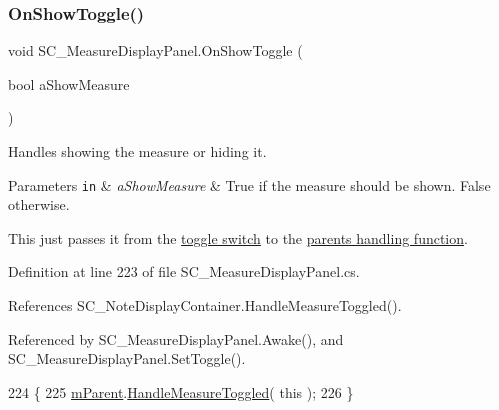 \mbox{\label{group___s_c___m_d_p_handlers_ga31c72fee5ddd5ae7b057b2f265341263}} 
\subsubsection{\texorpdfstring{On\+Show\+Toggle()}{OnShowToggle()}}
{\footnotesize\ttfamily void S\+C\+\_\+\+Measure\+Display\+Panel.\+On\+Show\+Toggle (\begin{DoxyParamCaption}\item[{bool}]{a\+Show\+Measure }\end{DoxyParamCaption})}



Handles showing the measure or hiding it. 


\begin{DoxyParams}[1]{Parameters}
\mbox{\tt in}  & {\em a\+Show\+Measure} & True if the measure should be shown. False otherwise.\\
\hline
\end{DoxyParams}
This just passes it from the \hyperlink{group___s_c___m_d_p_priv_var_gabec551ab0b79d269b028f4bc99e82b00}{toggle switch} to the \hyperlink{group___s_c___n_d_c_handlers_ga458d57203645be514d3626211044b584}{parent\textquotesingle{}s handling function}. 

Definition at line 223 of file S\+C\+\_\+\+Measure\+Display\+Panel.\+cs.



References S\+C\+\_\+\+Note\+Display\+Container.\+Handle\+Measure\+Toggled().



Referenced by S\+C\+\_\+\+Measure\+Display\+Panel.\+Awake(), and S\+C\+\_\+\+Measure\+Display\+Panel.\+Set\+Toggle().


\begin{DoxyCode}
224     \{
225         \hyperlink{group___s_c___m_d_p_priv_var_ga6f22ae359dd68605a8b2fd961ced96b5}{mParent}.\hyperlink{group___s_c___n_d_c_handlers_ga458d57203645be514d3626211044b584}{HandleMeasureToggled}( \textcolor{keyword}{this} );
226     \}
\end{DoxyCode}
